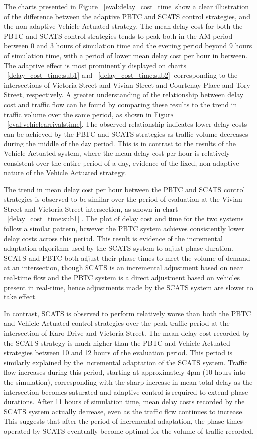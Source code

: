 The charts presented in Figure ~\ref{eval:delay_cost_time} show a clear illustration of the difference between the adaptive PBTC and SCATS control strategies, and the non-adaptive Vehicle Actuated strategy. The mean delay cost for both the PBTC and SCATS control strategies tends to peak both in the AM period between 0 and 3 hours of simulation time and the evening period beyond 9 hours of simulation time, with a period of lower mean delay cost per hour in between. The adaptive effect is most prominently displayed on charts ~\ref{delay_cost_time:sub1} and ~\ref{delay_cost_time:sub2}, corresponding to the intersections of Victoria Street and Vivian Street and Courtenay Place and Tory Street, respectively. A greater understanding of the relationship between delay cost and traffic flow can be found by comparing these results to the trend in traffic volume over the same period, as shown in Figure ~\ref{eval:vehiclearrivalstime}. The observed relationship indicates lower delay costs can be achieved by the PBTC and SCATS strategies as traffic volume decreases during the middle of the day period. This is in contrast to the results of the Vehicle Actuated system, where the mean delay cost per hour is relatively consistent over the entire period of a day, evidence of the fixed, non-adaptive nature of the Vehicle Actuated strategy.

The trend in mean delay cost per hour between the PBTC and SCATS control strategies is observed to be similar over the period of evaluation at the Vivian Street and Victoria Street intersection, as shown in chart ~\ref{delay_cost_time:sub1} . The plot of delay cost and time for the two systems follow a similar pattern, however the PBTC system achieves consistently lower delay costs across this period. This result is evidence of the incremental adaptation algorithm used by the SCATS system to adjust phase duration. SCATS and PBTC both adjust their phase times to meet the volume of demand at an intersection, though SCATS is an incremental adjustment based on near real-time flow and the PBTC system is a direct adjustment based on vehicles present in real-time, hence adjustments made by the SCATS system are slower to take effect.

In contrast, SCATS is observed to perform relatively worse than both the PBTC and Vehicle Actuated control strategies over the peak traffic period at the intersection of Karo Drive and Victoria Street. The mean delay cost recorded by the SCATS strategy is much higher than the PBTC and Vehicle Actuated strategies between 10 and 12 hours of the evaluation period. This period is similarly explained by the incremental adaptation of the SCATS system. Traffic flow increases during this period, starting at approximately 4pm (10 hours into the simulation), corresponding with the sharp increase in mean total delay as the intersection becomes saturated and adaptive control is required to extend phase durations. After 11 hours of simulation time, mean delay costs recorded by the SCATS system actually decrease, even as the traffic flow continues to increase. This suggests that after the period of incremental adaptation, the phase times operated by SCATS eventually become optimal for the volume of traffic recorded. 


